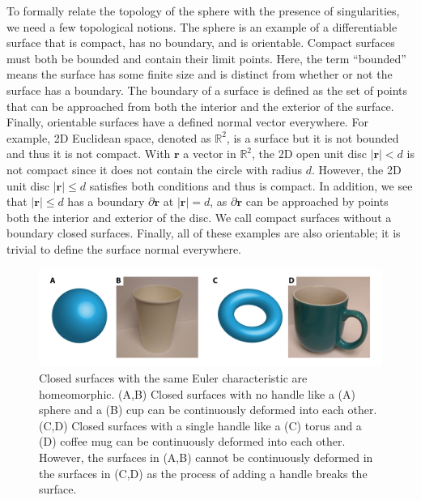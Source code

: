 To formally relate the topology of the sphere with the presence of singularities, we need a few topological notions.
The sphere is an example of a differentiable surface that is compact, has no boundary, and is orientable.
Compact surfaces must both be bounded and contain their limit points.
Here, the term ``bounded'' means the surface has some finite size and is distinct from whether or not the surface has a boundary.
The boundary of a surface is defined as the set of points that can be approached from both the interior and the exterior of the surface.
Finally, orientable surfaces have a defined normal vector everywhere.
For example, 2D Euclidean space, denoted as $\mathbb{R}^2$, is a surface but it is not bounded and thus it is not compact.
With $\mathbf{r}$ a vector in $\mathbb{R}^2$, the 2D open unit disc $|\mathbf{r}| < d$ is not compact since it does not contain the circle with radius $d$.
However, the 2D unit disc $|\mathbf{r}| \leq d$ satisfies both conditions and thus is compact.
In addition, we see that $|\mathbf{r}| \leq d$ has a boundary $\partial \mathbf{r}$ at $|\mathbf{r}| = d$, as $\partial \mathbf{r}$ can be approached by points both the interior and exterior of the disc.
We call compact surfaces without a boundary closed surfaces.
Finally, all of these examples are also orientable; it is trivial to define the surface normal everywhere.
\begin{figure}
  \centering
  \includegraphics{figures/C1/Ch1-Figs_ChiObjects.png}
  \caption{Closed surfaces with the same Euler characteristic are homeomorphic. (A,B) Closed surfaces with no handle like a (A) sphere and a (B) cup can be continuously deformed into each other.
  (C,D) Closed surfaces with a single handle like a (C) torus and a (D) coffee mug can be continuously deformed into each other.
  However, the surfaces in (A,B) cannot be continuously deformed in the surfaces in (C,D) as the process of adding a handle breaks the surface.}\label{f:1-ChiObjects}
\end{figure}

